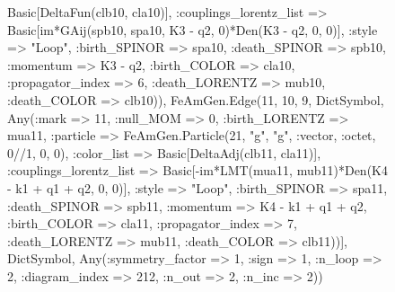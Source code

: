 \documentclass{revtex4}
\begin{document}
\begin{figure}[!htb]
\begin{center}
{Basic[DeltaFun(clb10, cla10)], :couplings_lorentz_list => Basic[im*GAij(spb10, spa10, K3 - q2, 0)*Den(K3 - q2, 0, 0)], :style => "Loop", :birth_SPINOR => spa10, :death_SPINOR => spb10, :momentum => K3 - q2, :birth_COLOR => cla10, :propagator_index => 6, :death_LORENTZ => mub10, :death_COLOR => clb10)), FeAmGen.Edge(11, 10, 9, Dict{Symbol, Any}(:mark => 11, :null_MOM => 0, :birth_LORENTZ => mua11, :particle => FeAmGen.Particle(21, "g", "g", :vector, :octet, 0//1, 0, 0), :color_list => Basic[DeltaAdj(clb11, cla11)], :couplings_lorentz_list => Basic[-im*LMT(mua11, mub11)*Den(K4 - k1 + q1 + q2, 0, 0)], :style => "Loop", :birth_SPINOR => spa11, :death_SPINOR => spb11, :momentum => K4 - k1 + q1 + q2, :birth_COLOR => cla11, :propagator_index => 7, :death_LORENTZ => mub11, :death_COLOR => clb11))], Dict{Symbol, Any}(:symmetry_factor => 1, :sign => 1, :n_loop => 2, :diagram_index => 212, :n_out => 2, :n_inc => 2)) 
}
\end{center}
\end{figure}
\end{document}
